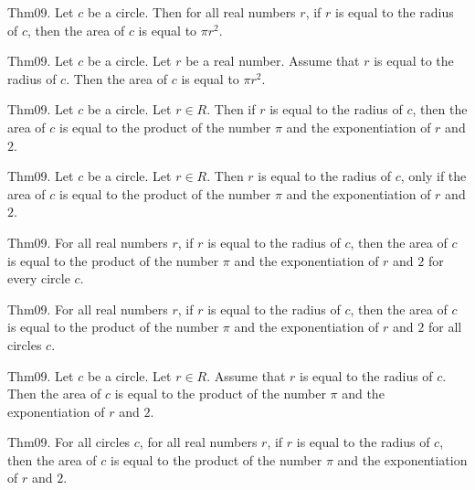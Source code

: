 \documentclass{article}
\begin{document}
Thm09. Let $c$ be a circle. Then for all real numbers $r$, if $r$ is equal to the radius of $c$, then the area of $c$ is equal to $\pi r ^ {2}$.

Thm09. Let $c$ be a circle. Let $r$ be a real number. Assume that $r$ is equal to the radius of $c$. Then the area of $c$ is equal to $\pi r ^ {2}$.

Thm09. Let $c$ be a circle. Let $r \in R$. Then if $r$ is equal to the radius of $c$, then the area of $c$ is equal to the product of the number \(\pi\) and the exponentiation of $r$ and $2$.

Thm09. Let $c$ be a circle. Let $r \in R$. Then $r$ is equal to the radius of $c$, only if the area of $c$ is equal to the product of the number \(\pi\) and the exponentiation of $r$ and $2$.

Thm09. For all real numbers $r$, if $r$ is equal to the radius of $c$, then the area of $c$ is equal to the product of the number \(\pi\) and the exponentiation of $r$ and $2$ for every circle $c$.

Thm09. For all real numbers $r$, if $r$ is equal to the radius of $c$, then the area of $c$ is equal to the product of the number \(\pi\) and the exponentiation of $r$ and $2$ for all circles $c$.

Thm09. Let $c$ be a circle. Let $r \in R$. Assume that $r$ is equal to the radius of $c$. Then the area of $c$ is equal to the product of the number \(\pi\) and the exponentiation of $r$ and $2$.

Thm09. For all circles $c$, for all real numbers $r$, if $r$ is equal to the radius of $c$, then the area of $c$ is equal to the product of the number \(\pi\) and the exponentiation of $r$ and $2$.
\end{document}
